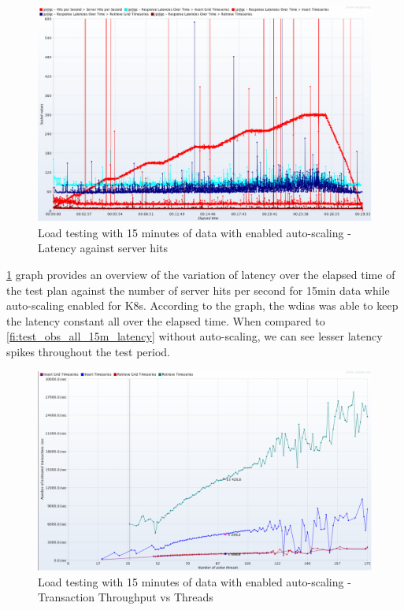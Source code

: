\begin{figure}[htp]
    \centering
    \includegraphics[width=1.0\textwidth]{results/obs/all_auto/obs_all_auto_15m_res_latencies_against_hits.png}
    \caption{Load testing with 15 minutes of data with enabled auto-scaling - Latency against server hits}
    \label{fi:test_obs_all_auto_15m_latency}
\end{figure}
\cref{fi:test_obs_all_auto_15m_latency} graph provides an overview of the variation of latency over the elapsed time of the test plan against the number of server hits per second for 15min data while auto-scaling enabled for K8s. According to the graph, the \acrshort{wdias} was able to keep the latency constant all over the elapsed time.
When compared to \cref{fi:test_obs_all_15m_latency} without auto-scaling, we can see lesser latency spikes throughout the test period.

\begin{figure}[htp]
    \centering
    \includegraphics[width=1.0\textwidth]{results/obs/all_auto/obs_all_auto_15m_transaction_throughtput_vs_threads.png}
    \caption{Load testing with 15 minutes of data with enabled auto-scaling - Transaction Throughput vs Threads}
    \label{fi:test_obs_all_auto_15m_throughtput}
\end{figure}

